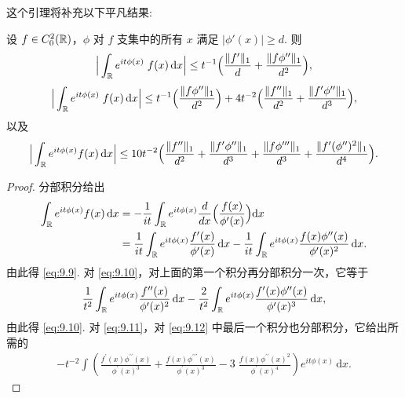 这个引理将补充以下平凡结果:

\begin{lemma}\label{lem:9.4}
设 $f \in C_0^2(\mathbb{R})$，$\phi$ 对 $f$ 支集中的所有 $x$ 满足 $|\phi'(x)| \geq d$. 则
\begin{equation}\label{eq:9.9}
  \Big|\int_{\mathbb{R}}e^{i t\phi(x)}\;f(x)\,\mathrm{d}x\Big|
  \leq t^{-1}\Bigl(\frac{\|f^{\prime}\|_{1}}{d}+\frac{\|f\phi^{\prime\prime}\|_{1}}{d^{2}}\Bigr),
\end{equation}
\begin{equation}\label{eq:9.10}
  \Big|\int_{\mathbb{R}}e^{i t\phi(x)}\;f(x)\,\mathrm{d}x\Big|
  \leq t^{-1}\Bigl(\frac{\|f\phi^{\prime\prime}\|_{1}}{d^{2}}\Bigr)
  +4t^{-2}\Bigl(\frac{\|f^{\prime\prime}\|_{1}}{d^{2}}+\frac{\|f^{\prime}\phi^{\prime\prime}\|_{1}}{d^{3}}\Bigr),
\end{equation}
以及
\begin{equation}\label{eq:9.11}
  \Big|\int_{\mathbb{R}}e^{i t\phi(x)}f(x)\,\mathrm{d}x\Big|
  \leq 10t^{-2}\Bigl(\frac{\|f^{\prime\prime}\|_{1}}{d^{2}}+\frac{\|f^{\prime}\phi^{\prime\prime}\|_{1}}{d^{3}}
  +\frac{\|f\phi^{\prime\prime\prime}\|_{1}}{d^{3}}+\frac{\|f^{\prime}(\phi^{\prime\prime})^{2}\|_{1}}{d^{4}}\Bigr).
\end{equation}
\end{lemma}

\begin{proof}
分部积分给出
\begin{equation}\label{eq:9.12}
  \begin{aligned}
  \int_{\mathbb{R}}e^{it\phi(x)}f(x)\,\mathrm{d}x
  &=-\frac{1}{it}\int_{\mathbb{R}}e^{it\phi(x)}\frac{d}{dx}\Bigl(\frac{f(x)}{\phi^{\prime}(x)}\Bigr)\mathrm{d}x\\
  &=\frac{1}{it}\int_{\mathbb{R}}e^{it\phi(x)}\frac{f^{\prime}(x)}{\phi^{\prime}(x)}\,\mathrm{d}x
   -\frac{1}{it}\int_{\mathbb{R}}e^{it\phi(x)}\frac{f(x)\phi^{\prime\prime}(x)}{\phi^{\prime}(x)^{2}}\,\mathrm{d}x.
  \end{aligned}
\end{equation}
由此得 \eqref{eq:9.9}. 对 \eqref{eq:9.10}，对上面的第一个积分再分部积分一次，它等于
\begin{align*}
  \frac{1}{t^{2}}\int_{\mathbb{R}}e^{i t\phi(x)}\frac{f^{\prime\prime}(x)}{\phi^{\prime}(x)^{2}}\,\mathrm{d}x
  -\frac{2}{t^{2}}\int_{\mathbb{R}}e^{i t\phi(x)}\frac{f^{\prime}(x)\phi^{\prime\prime}(x)}{\phi^{\prime}(x)^{3}}\,\mathrm{d}x,
\end{align*}
由此得 \eqref{eq:9.10}. 对 \eqref{eq:9.11}，对 \eqref{eq:9.12} 中最后一个积分也分部积分，它给出所需的
\begin{align*}
  -t^{-2}\int\left(\frac{f^{\prime}(x)\phi^{\prime\prime}(x)}{\phi^{\prime}(x)^{3}}
  +\frac{f(x)\phi^{\prime\prime\prime}(x)}{\phi^{\prime}(x)^{3}}
  -3\;\frac{f(x)\phi^{\prime\prime}(x)^{2}}{\phi^{\prime}(x)^{4}}\right)e^{i t\phi(x)}\,\mathrm{d}x.
\end{align*}
\end{proof}

